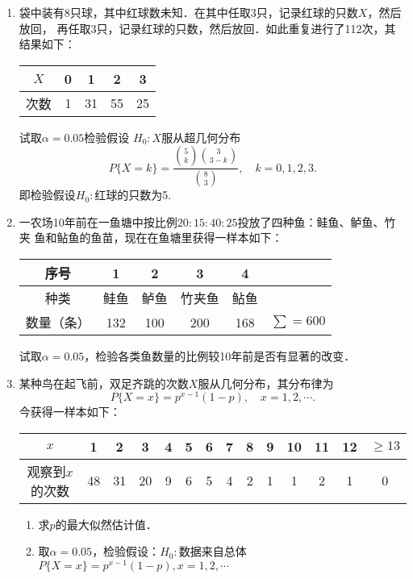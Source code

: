 \documentclass[10pt,a4paper]{article}
\begin{document}
\begin{enumerate}
    \item 袋中装有8只球，其中红球数未知．在其中任取3只，记录红球的只数$X$，然后放回，
    再任取3只，记录红球的只数，然后放回．如此重复进行了112次，其结果如下：
    \renewcommand{\arraystretch}{1.3}
    \begin{table}[H]\centering
        \begin{tabular}{c|cccc}
        $X$ & 0 & 1  & 2  & 3  \\ \hline
        次数  & 1 & 31 & 55 & 25
        \end{tabular}
        \end{table}
    \renewcommand{\arraystretch}{1.0}
    试取$\alpha=0.05$检验假设
    $H_0:X$服从超几何分布
    $$P\{X=k\}=\dfrac{\binom{5}{k} \binom{3}{3-k}} {\binom{8}{3}} ,\quad k=0,1,2,3.$$
    即检验假设$H_0:$红球的只数为5.






    \item 一农场10年前在一鱼塘中按比例$20:15:40:25$投放了四种鱼：鲑鱼、鲈鱼、竹夹
    鱼和鲇鱼的鱼苗，现在在鱼塘里获得一样本如下：
    \renewcommand{\arraystretch}{1.3}
    \begin{table}[H]\centering
        \begin{tabular}{c|ccccc}
        \hline
        序号    & 1   & 2   & 3   & 4   &            \\ \hline
        种类    & 鲑鱼  & 鲈鱼  & 竹夹鱼 & 鲇鱼  &            \\ \hline
        数量（条） & 132 & 100 & 200 & 168 & $\sum=600$ \\ \hline
        \end{tabular}
    \end{table}
    \renewcommand{\arraystretch}{1.0}
    试取$\alpha=0.05$，检验各类鱼数量的比例较10年前是否有显著的改变．




    \item 某种鸟在起飞前，双足齐跳的次数$X$服从几何分布，其分布律为
    $$P\{X=x\}=p^{x-1}(1-p),\quad x=1,2,\cdots.$$
    今获得一样本如下：
    \renewcommand{\arraystretch}{1.3}
    \begin{table}[H]\centering
        \begin{tabular}{c|ccccccccccccc}
        $x$       & 1  & 2  & 3  & 4 & 5 & 6 & 7 & 8 & 9 & 10 & 11 & 12 & $\geq 13$ \\ \hline
        观察到$x$的次数 & 48 & 31 & 20 & 9 & 6 & 5 & 4 & 2 & 1 & 1  & 2  & 1  & 0        
        \end{tabular}
    \end{table}
    \renewcommand{\arraystretch}{1.0}
    \begin{enumerate}
        \item 求$p$的最大似然估计值．
        \item 取$\alpha=0.05$，检验假设：$H_0:$数据来自总体$P\{X=x\}=p^{x-1}(1-p),x=1,2,\cdots$
    \end{enumerate}






\end{enumerate}
\end{document}
